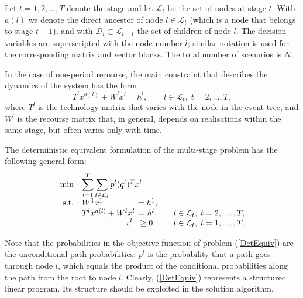 Let $t = 1,2,\ldots,T$ denote the stage and let $\mathcal{L}_t$ 
be the set of nodes at stage $t$.
With $a(l)$ we denote the direct ancestor of node $l\in\mathcal{L}_t$ 
(which is a node that belongs to stage $t-1$), and with
$\mathcal{D}_l\subset\mathcal{L}_{t+1}$ the set of children of node $l$.
The decision variables are superscripted with the node number $l$;
similar notation is used for the corresponding matrix and vector blocks.
The total number of scenarios is $N$.

In the case of one-period recourse, 
the main constraint that describes the dynamics of the system has the form 
\[
  T^{l}x^{a(l)} +W^{l}x^{l} =h^{l}, \qquad l \in\mathcal{L}_t,\; t=2,\ldots,T,
\]
%
where $T^{l}$ is the technology matrix that varies 
with the node in the event tree, and $W^{l}$ is the recourse
matrix that, in general, depends on realisations within the same stage,
but often varies only with time.

The deterministic equivalent formulation of the multi-stage 
problem has the following general form:
\begin{equation}  \label{DetEquiv}
  \begin{array}{rlcll}
  \min & \displaystyle\sum_{t=1}^T\sum_{l\in\mathcal{L}_t} p^l (q^l)^T x^{l}\\
  \mbox{s.t.} & W^1 x^1            & \hspace{-1.5em} = h^1, \\
    & T^{l} x^{a(l)} + W^{l} x^{l} & \hspace{-1.5em} = h^{l}, 
                               &\quad l\in\mathcal{L}_t,\; t = 2,\dots,T, \\
    & \hspace{5.3em} x^{l}         & \hspace{-1.5em} \geq 0,
                               &\quad l\in\mathcal{L}_t,\; t = 1,\dots,T. \\
  \end{array}
\end{equation}

Note that the probabilities in the objective function of problem 
(\ref{DetEquiv}) are the unconditional path probabilities: $p^l$ is 
the probability that a path goes through node $l$, which equals the 
product of the conditional probabilities along the path from the root 
to node $l$.
Clearly, (\ref{DetEquiv}) represents a structured linear program. Its 
structure should be exploited in the solution algorithm.

